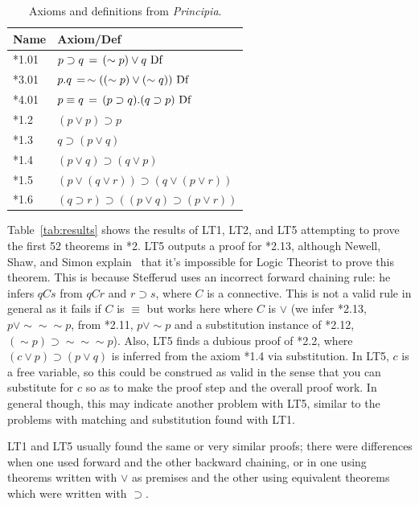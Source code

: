\documentclass{IEEEcsmag}
\begin{document}
%
%
\begin{table}[h]
\centering
\caption{Axioms and definitions from \textit{Principia}.}
\label{tab:axioms}
\begin{tabular}{ll}
\toprule
\textbf{Name} & \textbf{Axiom/Def}\\
\midrule
*1.01  & $p\supset q \, = \,(\sim p) \vee q\ {\rm Df}$\\
*3.01  & 
$p.q \, = \, \sim((\sim p)\vee (\sim q))\ {\rm Df}$\\
*4.01  & $p\equiv q\, = \, (p\supset q).(q\supset p)\ {\rm Df}$\\
*1.2   & $(p\vee p)\supset p$\\
*1.3   & $q\supset(p\vee q)$\\
*1.4   & $(p\vee q)\supset(q \vee p)$\\
*1.5   & $(p\vee(q\vee r))\supset (q\vee(p \vee r))$\\
*1.6   & $(q\supset r)\supset((p\vee q)\supset(p\vee r))$\\
\bottomrule
\end{tabular}
\end{table}

Table~\ref{tab:results} shows the results of LT1, LT2, and LT5
attempting to prove the first 52 theorems in *2. 
LT5 outputs a proof for *2.13, although Newell, Shaw, and Simon
explain~\cite[p.~222]{LT1957} that it's impossible for Logic 
Theorist to prove this theorem.  This is because Stefferud uses
an incorrect forward chaining rule: he infers $q C s$ from
$q C r$ and $r\supset s$, where $C$ is a connective.  This 
is not a valid rule in general as it fails if $C$ is $\equiv$
but works here where $C$ is $\vee$
(we infer *2.13, $p \vee \sim \sim \sim p$, from 
*2.11, $p \vee \sim p$
and a substitution instance of *2.12,
$(\sim p) \supset \sim \sim \sim p$).
Also, LT5 finds a dubious proof of *2.2, where
$(c\vee p)\supset(p\vee q)$ is inferred from the axiom *1.4 via 
substitution.  In LT5, $c$ is a free variable,
so this could be construed as valid in the sense that you can
substitute for $c$ so as to make the proof step and the overall
proof work.  In general though, this may indicate another problem with LT5,
similar to the problems with matching and substitution found with LT1.

LT1 and LT5 usually found the same or very similar proofs;
there were differences when one used forward and the other
backward chaining, or in one using theorems written with $\vee$ as premises
and the other using equivalent theorems which were written with $\supset$.
\end{document}
